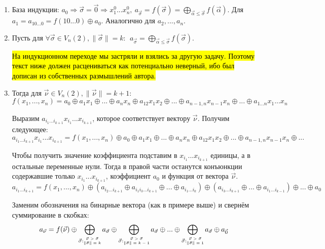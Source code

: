 \documentclass[a4paper,12pt]{article}
\newcommand{\xor}{\oplus}
\newcommand{\weight}[1]{\|#1\|}
\newcommand{\stack}[1]{\begin{matrix} #1 \end{matrix}}
\begin{document}
	\begin{enumerate}
		\item База индукции: $a_0 \Rightarrow \vec{\sigma} = \vec{0} \Rightarrow x_1^0 ... x_n^0, ~ a_{\vec{\sigma}} = f(\vec{\sigma}) = \bigoplus_{\vec{\alpha} \le \vec{\sigma}} f(\vec{\alpha}) $. Для $a_1 = a_{10...0} = f(10...0)\xor a_0$. Аналогично для $a_2,...,a_n$.
	
	\item Пусть для $\forall \vec{\sigma} \in V_n(2), \weight{\vec{\sigma}} = k: ~~ a_{\vec{\sigma}} = \bigoplus_{\vec{\alpha} \le \vec{\sigma}} f(\vec{\sigma})$.
	
	\hl{На индукционном переходе мы застряли и взялись за другую задачу. Поэтому текст ниже должен расцениваться как потенциально неверный, ибо был дописан из собственных размышлений автора.}
	
	\item Тогда для $\vec{\nu} \in V_n(2), \weight{\vec{\nu}} = k+1$:
	$$
	f(x_1, ..., x_n) = a_0 \xor a_1 x_1 \xor ... \xor a_n x_n \xor a_{12} x_1 x_2 \xor ... \xor a_{n-1, n} x_{n-1} x_n \xor ... \xor a_{1...n} x_1 ... x_n
	$$
	
	Выразим $a_{i_1...i_{k+1}} x_{i_1} ... x_{i_{k+1}}$, которое соответствует вектору $\vec{\nu}$. Получим следующее:
	$$
	a_{i_1...i_{k+1}} x_{i_1} ... x_{i_{k+1}} =  f(x_1, ..., x_n) \xor a_0 \xor a_1 x_1 \xor ... \xor a_n x_n \xor a_{12} x_1 x_2 \xor ... \xor a_{n-1, n} x_{n-1} x_n \xor ...
	$$
	
	Чтобы получить значение коэффициента подставим в $ x_{i_1} ... x_{i_{k+1}}$ единицы, а в остальные переменные нули. Тогда в правой части останутся конъюнкции содержавшие только $ x_{i_1} ... x_{i_{k+1}}$, коэффициент $a_0$ и функция от вектора $\vec{\nu}$.
	$$
	a_{i_1...i_{k+1}} =  f(x_1, ..., x_n) \xor (a_{i_2 ... i_{k+1}} \xor a_{i_1 i_3 ... i_{k+1}} \xor ... \xor a_{i_1 ... i_k}) \xor (a_{i_3 ... i_{k+1}} \xor ... \xor a_{i_1 ... i_{k-1}}) \xor ... \xor a_0
	$$
	
	Заменим обозначения на бинарные вектора (как в примере выше) и свернём суммирование в скобках:
	$$
	a_{\vec{\nu}} = f(\vec{\nu}) \xor
	\bigoplus_{\vec{\sigma}: {\tiny \stack{\vec{\nu} > \vec{\sigma} \\
				\weight{\vec{\sigma}} = k}} } a_{\vec{\sigma}} \xor
	\bigoplus_{\vec{\sigma}: {\tiny \stack{\vec{\nu} > \vec{\sigma} \\
				\weight{\vec{\sigma}} = k-1}} } a_{\vec{\sigma}} \xor
	...
	\xor
	\bigoplus_{\vec{\sigma}: {\tiny \stack{\vec{\nu} > \vec{\sigma} \\
				\weight{\vec{\sigma}} = 1}} } a_{\vec{\sigma}} \xor
	a_{\vec{0}}
	$$
	
	
\end{enumerate}
\end{document}
